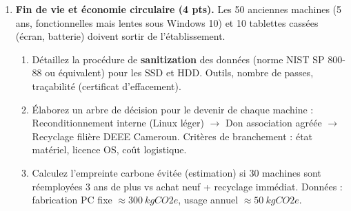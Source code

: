 \documentclass[11pt]{article}
\begin{document}
\begin{exercice}
\begin{enumerate}
    \item \textbf{Fin de vie et économie circulaire (4 pts).} 
    Les 50 anciennes machines (5 ans, fonctionnelles mais lentes sous Windows 10) et 10 tablettes cassées (écran, batterie) doivent sortir de l'établissement.
    \begin{enumerate}
        \item Détaillez la procédure de \textbf{sanitization} des données (norme NIST SP 800-88 ou équivalent) pour les SSD et HDD. Outils, nombre de passes, traçabilité (certificat d'effacement).
        \item Élaborez un arbre de décision pour le devenir de chaque machine : Reconditionnement interne (Linux léger) $\to$ Don association agréée $\to$ Recyclage filière DEEE Cameroun. Critères de branchement : état matériel, licence OS, coût logistique.
        \item Calculez l'empreinte carbone évitée (estimation) si 30 machines sont réemployées 3 ans de plus vs achat neuf + recyclage immédiat. Données : fabrication PC fixe $\approx \SI{300}{kgCO2e}$, usage annuel $\approx \SI{50}{kgCO2e}$.
    \end{enumerate}
\end{enumerate}
\end{exercice}
\end{document}
